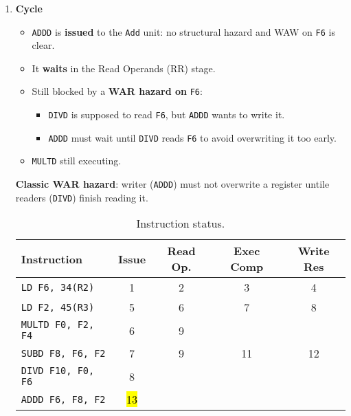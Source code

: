\begin{enumerate}
    \newpage


    \item \textbf{Cycle \theenumi}
    \begin{itemize}
        \item[\textcolor{Green3}{\faIcon{check}}] \texttt{ADDD} is \textbf{issued} to the \texttt{Add} unit: no structural hazard and WAW on \texttt{F6} is clear.
        \item[\textcolor{Green3}{\faIcon{check}}] It \textbf{waits} in the Read Operands (RR) stage.
        \item[\textcolor{Red2}{\faIcon{times}}] Still blocked by a \textbf{WAR hazard on} \texttt{F6}:
        \begin{itemize}
            \item \texttt{DIVD} is supposed to read \texttt{F6}, but \texttt{ADDD} wants to write it.
            \item \texttt{ADDD} must wait until \texttt{DIVD} reads \texttt{F6} to avoid overwriting it too early.
        \end{itemize}
        \item \texttt{MULTD} still executing.
    \end{itemize}
    \textbf{Classic WAR hazard}: writer (\texttt{ADDD}) must not overwrite a register untile readers (\texttt{DIVD}) finish reading it.

    \begin{table}[!htp]
        \centering
        \begin{tabular}{@{} l | c c c c @{}}
            \toprule
            Instruction                 & Issue     & Read Op.  & Exec Comp & Write Res \\
            \midrule
            \texttt{LD    F6, 34(R2)}   & 1         & 2         & 3         & 4         \\ [.3em]
            \texttt{LD    F2, 45(R3)}   & 5         & 6         & 7         & 8         \\ [.3em]
            \texttt{MULTD F0, F2, F4}   & 6         & 9         &           &           \\ [.3em]
            \texttt{SUBD  F8, F6, F2}   & 7         & 9         & 11        & 12        \\ [.3em]
            \texttt{DIVD  F10, F0, F6}  & 8         &           &           &           \\ [.3em]
            \texttt{ADDD  F6, F8, F2}   & \hl{13}   &           &           &           \\
            \bottomrule
        \end{tabular}
        \caption*{Instruction status.}
    \end{table}


\end{enumerate}
